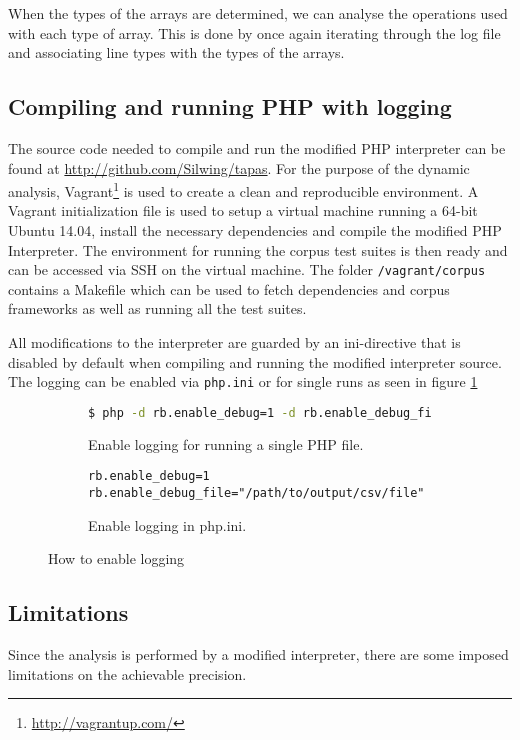 When the types of the arrays are determined, we can analyse the operations used with each type of array. This is done by once again iterating through the log file and associating line types with the types of the arrays.

\subsection{Compiling and running PHP with logging}
The source code needed to compile and run the modified PHP interpreter can be found at \url{http://github.com/Silwing/tapas}. For the purpose of the dynamic analysis, Vagrant\footnote{\url{http://vagrantup.com/}} is used to create a clean and reproducible environment. A Vagrant initialization file is used to setup a virtual machine running a 64-bit Ubuntu 14.04, install the necessary dependencies and compile the modified PHP Interpreter. The environment for running the corpus test suites is then ready and can be accessed via SSH on the virtual machine. The folder \texttt{/vagrant/corpus} contains a Makefile which can be used to fetch dependencies and corpus frameworks as well as running all the test suites.

All modifications to the interpreter are guarded by an ini-directive that is disabled by default when compiling and running the modified interpreter source. The logging can be enabled via \texttt{php.ini} or for single runs as seen in figure \ref{fig:iniDirective}

\begin{figure}[ht]
\centering
\begin{subfigure}{\linewidth}
\begin{lstlisting}[language=bash]
$ php -d rb.enable_debug=1 -d rb.enable_debug_file=<path-to-log-file> <path-to-php-file>
\end{lstlisting}
\caption{Enable logging for running a single PHP file.}
\end{subfigure}
\begin{subfigure}{\linewidth}
\begin{lstlisting}
rb.enable_debug=1
rb.enable_debug_file="/path/to/output/csv/file"
\end{lstlisting}
\caption{Enable logging in php.ini.}
\end{subfigure}
\caption{How to enable logging}
\label{fig:iniDirective}
\end{figure}

\subsection{Limitations}
\label{sec:limitations}
Since the analysis is performed by a modified interpreter, there are some imposed limitations on the achievable precision. 

